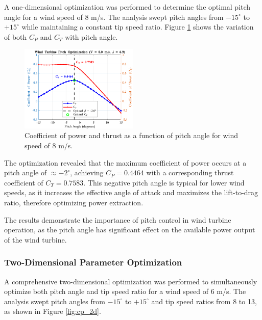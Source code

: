 \documentclass[11pt]{article}
\begin{document}
A one-dimensional optimization was performed to determine the optimal pitch angle for a wind speed of 8 m/s. The analysis swept pitch angles from $-15^{\circ}$ to $+15^{\circ}$ while maintaining a constant tip speed ratio. Figure \ref{fig:cp_ct_vs_pitch} shows the variation of both $C_P$ and $C_T$ with pitch angle.

\begin{figure}[H]
  \centering
  \includegraphics[width=0.5\textwidth]{media/Pitch_Optimization_Results.png}
  \caption{Coefficient of power and thrust as a function of pitch angle for wind speed of 8 m/s.}
  \label{fig:cp_ct_vs_pitch}
\end{figure}

The optimization revealed that the maximum coefficient of power occurs at a pitch angle of $\approx -2^{\circ}$, achieving $C_P = 0.4464$ with a corresponding thrust coefficient of $C_T = 0.7583$. This negative pitch angle is typical for lower wind speeds, as it increases the effective angle of attack and maximizes the lift-to-drag ratio, therefore optimizing power extraction.

The results demonstrate the importance of pitch control in wind turbine operation, as the pitch angle has significant effect on the available power output of the wind turbine. 

\subsubsection{Two-Dimensional Parameter Optimization}

A comprehensive two-dimensional optimization was performed to simultaneously optimize both pitch angle and tip speed ratio for a wind speed of 6 m/s. The analysis swept pitch angles from $-15^{\circ}$ to $+15^{\circ}$ and tip speed ratios from 8 to 13, as shown in Figure \ref{fig:cp_2d}.
\end{document}

